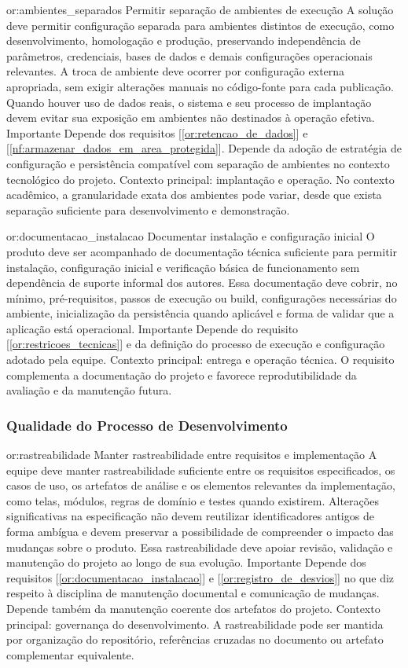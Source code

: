 \reqoutro
{or:ambientes_separados}
{Permitir separação de ambientes de execução}
{A solução deve permitir configuração separada para ambientes distintos de execução, como desenvolvimento, homologação e produção, preservando independência de parâmetros, credenciais, bases de dados e demais configurações operacionais relevantes. A troca de ambiente deve ocorrer por configuração externa apropriada, sem exigir alterações manuais no código-fonte para cada publicação. Quando houver uso de dados reais, o sistema e seu processo de implantação devem evitar sua exposição em ambientes não destinados à operação efetiva.}
{Importante}
{Depende dos requisitos [\ref{or:retencao_de_dados}] e [\ref{nf:armazenar_dados_em_area_protegida}]. Depende da adoção de estratégia de configuração e persistência compatível com separação de ambientes no contexto tecnológico do projeto.}
{Contexto principal: implantação e operação. No contexto acadêmico, a granularidade exata dos ambientes pode variar, desde que exista separação suficiente para desenvolvimento e demonstração.}

\reqoutro
{or:documentacao_instalacao}
{Documentar instalação e configuração inicial}
{O produto deve ser acompanhado de documentação técnica suficiente para permitir instalação, configuração inicial e verificação básica de funcionamento sem dependência de suporte informal dos autores. Essa documentação deve cobrir, no mínimo, pré-requisitos, passos de execução ou build, configurações necessárias do ambiente, inicialização da persistência quando aplicável e forma de validar que a aplicação está operacional.}
{Importante}
{Depende do requisito [\ref{or:restricoes_tecnicas}] e da definição do processo de execução e configuração adotado pela equipe.}
{Contexto principal: entrega e operação técnica. O requisito complementa a documentação do projeto e favorece reprodutibilidade da avaliação e da manutenção futura.}

\subsubsection*{Qualidade do Processo de Desenvolvimento}

\reqoutro
{or:rastreabilidade}
{Manter rastreabilidade entre requisitos e implementação}
{A equipe deve manter rastreabilidade suficiente entre os requisitos especificados, os casos de uso, os artefatos de análise e os elementos relevantes da implementação, como telas, módulos, regras de domínio e testes quando existirem. Alterações significativas na especificação não devem reutilizar identificadores antigos de forma ambígua e devem preservar a possibilidade de compreender o impacto das mudanças sobre o produto. Essa rastreabilidade deve apoiar revisão, validação e manutenção do projeto ao longo de sua evolução.}
{Importante}
{Depende dos requisitos [\ref{or:documentacao_instalacao}] e [\ref{or:registro_de_desvios}] no que diz respeito à disciplina de manutenção documental e comunicação de mudanças. Depende também da manutenção coerente dos artefatos do projeto.}
{Contexto principal: governança do desenvolvimento. A rastreabilidade pode ser mantida por organização do repositório, referências cruzadas no documento ou artefato complementar equivalente.}

